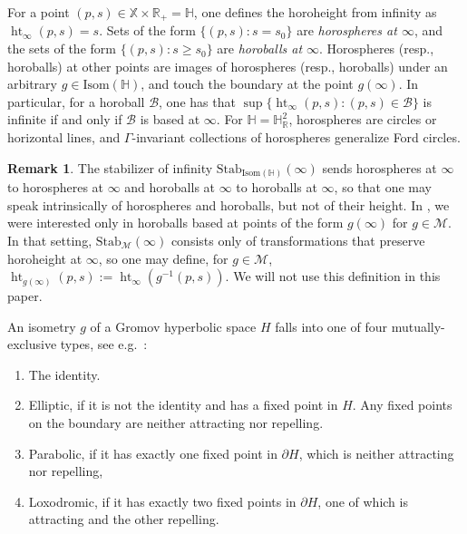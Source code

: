 \documentclass[reqno,10pt]{amsart}
\newcommand{\Hyp}{\mathbb{H}}
\newcommand{\R}{\mathbb{R}}
\newcommand{\X}{\mathbb X}
\newcommand{\horoheight}{\operatorname{ht}}
\newcommand{\Isom}{\text{Isom}}
\newcommand{\Stab}{\text{Stab}}
\numberwithin{thm}{section}
\theoremstyle{definition}
\theoremstyle{definition}
\newtheorem{remark}[thm]{Remark}
\numberwithin{equation}{section}
\newcommand{\Mod}{\mathcal M}
\begin{document}
For a point $(p,s)\in \X\times \R_+ = \Hyp$, one defines the horoheight from infinity as $\horoheight_\infty(p,s)=s$. Sets of the form $\{(p,s): s=s_0\}$ are \emph{horospheres at $\infty$}, and the sets of the form $\{(p,s): s\geq s_0\}$ are \emph{horoballs at $\infty$}. Horospheres (resp., horoballs) at other points are images of horospheres (resp., horoballs) under an arbitrary $g\in \Isom(\Hyp)$, and touch the boundary at the point $g(\infty)$. In particular, for a horoball $\mathcal B$, one has that $\sup \{\horoheight_\infty(p,s): (p,s)\in \mathcal B\}$ is infinite if and only if $\mathcal B$ is based at $\infty$. For $\Hyp=\Hyp^2_\R$, horospheres are circles or horizontal lines, and $\Gamma$-invariant collections of horospheres generalize Ford circles.

\begin{remark}
The stabilizer of infinity $\Stab_{\Isom(\Hyp)}(\infty)$ sends horospheres at $\infty$ to horospheres at $\infty$ and horoballs at $\infty$ to horoballs at $\infty$, so that one may speak intrinsically of horospheres and horoballs, but not of their height. In \cite{lukyanenko_vandehey_2022}, we were interested only in horoballs based at points of the form $g(\infty)$ for $g\in \Mod$. In that setting, $\Stab_\Mod(\infty)$ consists only of transformations that preserve horoheight at $\infty$, so one may define, for $g\in \Mod$, $\horoheight_{g(\infty)} (p,s) := \horoheight_\infty(g^{-1}(p,s))$. We will not use this definition in this paper.
\end{remark}

An isometry $g$ of a Gromov hyperbolic space $H$ falls into one of four mutually-exclusive types, see e.g.~\cite{DasSimmonsUrbanski}:
\begin{enumerate}
\item The identity.
\item Elliptic, if it is not the identity and has a fixed point in $H$. Any fixed points on the boundary are neither attracting nor repelling.
\item Parabolic, if it has exactly one fixed point in $\partial H$, which is neither attracting nor repelling,
\item Loxodromic, if it has exactly two fixed points in $\partial H$, one of which is attracting and the other repelling.
\end{enumerate}
\end{document}
